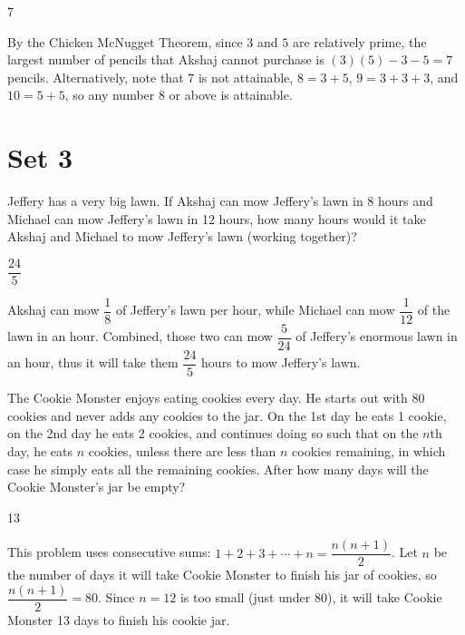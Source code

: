 \documentclass[11pt]{article}
\begin{document}
\begin{answer}
7
\end{answer}

\begin{solution}
By the Chicken McNugget Theorem, since $3$ and $5$ are relatively prime, the largest number of pencils that Akshaj cannot purchase is $(3)(5)-3-5 = 7$ pencils. Alternatively, note that $7$ is not attainable, $8 = 3+5$, $9 = 3 + 3 + 3$, and $10 = 5 + 5$, so any number $8$ or above is attainable.
\end{solution}

\newpage

\section*{Set 3}

\begin{problem}%
Jeffery has a very big lawn. If Akshaj can mow Jeffery's lawn in 8 hours and Michael can mow Jeffery's lawn in 12 hours, how many hours would it take Akshaj and Michael to mow Jeffery's lawn (working together)?
\end{problem}

\begin{answer}
$\dfrac{24}{5}$
\end{answer}

\begin{solution}
Akshaj can mow $\dfrac{1}{8}$ of Jeffery's lawn per hour, while Michael can mow $\dfrac{1}{12}$ of the lawn in an hour. Combined, those two can mow $\dfrac{5}{24}$ of Jeffery's enormous lawn in an hour, thus it will take them $\dfrac{24}{5}$ hours to mow Jeffery's lawn.
\end{solution}


\begin{problem}%
The Cookie Monster enjoys eating cookies every day. He starts out with 80 cookies and never adds any cookies to the jar. On the 1st day he eats 1 cookie, on the 2nd day he eats 2 cookies, and continues doing so such that on the $n$th day, he eats $n$ cookies, unless there are less than $n$ cookies remaining, in which case he simply eats all the remaining cookies. After how many days will the Cookie Monster's jar be empty? 
\end{problem}

\begin{answer}
13
\end{answer}

\begin{solution}
This problem uses consecutive sums: $1+2+3+ \cdots +n = \dfrac{n(n+1)}{2}$. Let $n$ be the number of days it will take Cookie Monster to finish his jar of cookies, so $\dfrac{n(n+1)}{2} = 80$. Since $n = 12$ is too small (just under 80), it will take Cookie Monster 13 days to finish his cookie jar.
\end{solution}
\end{document}
